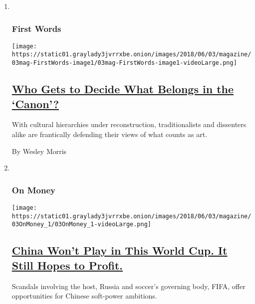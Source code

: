 \begin{enumerate}
\def\labelenumi{\arabic{enumi}.}
\item ~
  \hypertarget{first-words}{%
  \subsubsection{First Words}\label{first-words}}

  \texttt{[image: https://static01.graylady3jvrrxbe.onion/images/2018/06/03/magazine/03mag-FirstWords-image1/03mag-FirstWords-image1-videoLarge.png]}

  \hypertarget{who-gets-to-decide-what-belongs-in-the-canon}{%
  \subsection{\texorpdfstring{\href{/2018/05/30/magazine/who-gets-to-decide-what-belongs-in-the-canon.html}{Who
  Gets to Decide What Belongs in the
  `Canon'?}}{Who Gets to Decide What Belongs in the `Canon'?}}\label{who-gets-to-decide-what-belongs-in-the-canon}}

  With cultural hierarchies under reconstruction, traditionalists and
  dissenters alike are frantically defending their views of what counts
  as art.

  By Wesley Morris
\item ~
  \hypertarget{on-money}{%
  \subsubsection{On Money}\label{on-money}}

  \texttt{[image: https://static01.graylady3jvrrxbe.onion/images/2018/06/03/magazine/03OnMoney\_1/03OnMoney\_1-videoLarge.png]}

  \hypertarget{china-wont-play-in-this-world-cup-it-still-hopes-to-profit}{%
  \subsection{\texorpdfstring{\href{/2018/05/30/magazine/china-wont-play-in-this-world-cup-it-still-hopes-to-profit.html}{China
  Won't Play in This World Cup. It Still Hopes to
  Profit.}}{China Won't Play in This World Cup. It Still Hopes to Profit.}}\label{china-wont-play-in-this-world-cup-it-still-hopes-to-profit}}

  Scandals involving the host, Russia and soccer's governing body, FIFA,
  offer opportunities for Chinese soft-power ambitions.


\end{enumerate}
